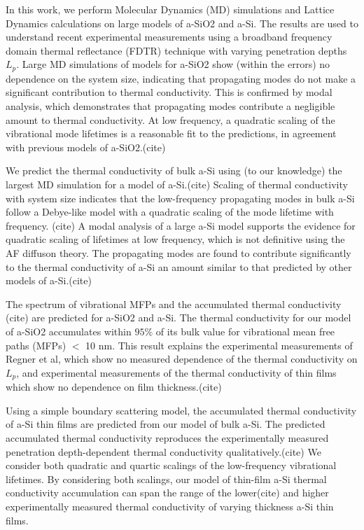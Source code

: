 \documentclass[aps,prb,twocolumn,superscriptaddress,footinbib,amsmath,amssymb,floatfix]{revtex4}
\begin{document}
In this work, we perform Molecular Dynamics (MD) simulations and 
Lattice Dynamics calculations on  
large models of a-SiO2 and a-Si. The results are used to 
understand recent experimental measurements using a broadband 
frequency domain thermal reflectance (FDTR) technique with varying 
penetration depths $L_p$.\cite{regner_broadband_2013}
Large MD 
simulations of models for a-SiO2 show (within the errors) no 
dependence on the system size, indicating that propagating modes 
do not make a significant contribution to thermal conductivity. 
This is confirmed by modal analysis, which demonstrates that 
propagating modes contribute a negligible amount to thermal 
conductivity. At low frequency, a quadratic scaling of the 
vibrational mode lifetimes is a reasonable fit to the predictions, 
in agreement with previous models of a-SiO2.(cite)

We predict the thermal conductivity of bulk a-Si using (to our 
knowledge) the largest MD simulation for a model of a-Si.(cite) 
Scaling 
of thermal conductivity with system size indicates that the 
low-frequency propagating modes in bulk a-Si follow a Debye-like model 
with a quadratic scaling of the mode lifetime with frequency.
(cite) 
A modal analysis of a large a-Si model supports the evidence 
for quadratic scaling of lifetimes at low frequency,  
which is not definitive using the AF diffuson theory.
\cite{feldman_thermal_1993,feldman_numerical_1999} The propagating 
modes are found to contribute significantly to the thermal 
conductivity of a-Si an amount similar to that predicted by 
other models of a-Si.(cite)

The spectrum of vibrational MFPs and the accumulated thermal conductivity
(cite) 
are predicted for a-SiO2 and a-Si. The thermal conductivity for our model 
of a-SiO2 accumulates within $95\%$ of its bulk value for vibrational 
mean free paths (MFPs) $<$ 10 nm. 
This result explains the experimental measurements 
of Regner et al, which show no measured dependence of the thermal 
conductivity on $L_p$,\cite{regner_broadband_2013} and experimental 
measurements of the thermal conductivity of thin films which 
show no dependence on film thickness.(cite) 

Using a simple boundary scattering model, the accumulated thermal 
conductivity of a-Si thin films are predicted from our model 
of bulk a-Si. The predicted accumulated thermal conductivity 
reproduces the experimentally measured penetration depth-dependent 
thermal conductivity qualitatively.(cite) We consider both 
quadratic and quartic 
scalings of the low-frequency 
vibrational lifetimes. 
By considering both scalings, our model of thin-film a-Si thermal 
conductivity accumulation can span the range of the 
lower(cite) and 
higher\cite{liu_high_2009,yang_anomalously_2010} 
experimentally measured thermal conductivity of varying thickness 
a-Si thin films. 
\end{document}
